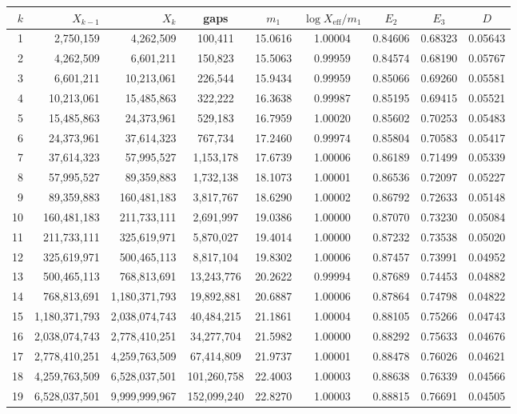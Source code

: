 \begin{tabular}{rrr c c c c c c}
\toprule
$k$ & $X_{k-1}$ & $X_k$ & gaps & $m_1$ & $\log X_{\mathrm{eff}}/m_1$ & $E_2$ & $E_3$ & $D$ \\
\midrule
1 & 2{,}750{,}159 & 4{,}262{,}509 & 100{,}411 & 15.0616 & 1.00004 & 0.84606 & 0.68323 & 0.05643 \\
2 & 4{,}262{,}509 & 6{,}601{,}211 & 150{,}823 & 15.5063 & 0.99959 & 0.84574 & 0.68190 & 0.05767 \\
3 & 6{,}601{,}211 & 10{,}213{,}061 & 226{,}544 & 15.9434 & 0.99959 & 0.85066 & 0.69260 & 0.05581 \\
4 & 10{,}213{,}061 & 15{,}485{,}863 & 322{,}222 & 16.3638 & 0.99987 & 0.85195 & 0.69415 & 0.05521 \\
5 & 15{,}485{,}863 & 24{,}373{,}961 & 529{,}183 & 16.7959 & 1.00020 & 0.85602 & 0.70253 & 0.05483 \\
6 & 24{,}373{,}961 & 37{,}614{,}323 & 767{,}734 & 17.2460 & 0.99974 & 0.85804 & 0.70583 & 0.05417 \\
7 & 37{,}614{,}323 & 57{,}995{,}527 & 1{,}153{,}178 & 17.6739 & 1.00006 & 0.86189 & 0.71499 & 0.05339 \\
8 & 57{,}995{,}527 & 89{,}359{,}883 & 1{,}732{,}138 & 18.1073 & 1.00001 & 0.86536 & 0.72097 & 0.05227 \\
9 & 89{,}359{,}883 & 160{,}481{,}183 & 3{,}817{,}767 & 18.6290 & 1.00002 & 0.86792 & 0.72633 & 0.05148 \\
10 & 160{,}481{,}183 & 211{,}733{,}111 & 2{,}691{,}997 & 19.0386 & 1.00000 & 0.87070 & 0.73230 & 0.05084 \\
11 & 211{,}733{,}111 & 325{,}619{,}971 & 5{,}870{,}027 & 19.4014 & 1.00000 & 0.87232 & 0.73538 & 0.05020 \\
12 & 325{,}619{,}971 & 500{,}465{,}113 & 8{,}817{,}104 & 19.8302 & 1.00006 & 0.87457 & 0.73991 & 0.04952 \\
13 & 500{,}465{,}113 & 768{,}813{,}691 & 13{,}243{,}776 & 20.2622 & 0.99994 & 0.87689 & 0.74453 & 0.04882 \\
14 & 768{,}813{,}691 & 1{,}180{,}371{,}793 & 19{,}892{,}881 & 20.6887 & 1.00006 & 0.87864 & 0.74798 & 0.04822 \\
15 & 1{,}180{,}371{,}793 & 2{,}038{,}074{,}743 & 40{,}484{,}215 & 21.1861 & 1.00004 & 0.88105 & 0.75266 & 0.04743 \\
16 & 2{,}038{,}074{,}743 & 2{,}778{,}410{,}251 & 34{,}277{,}704 & 21.5982 & 1.00000 & 0.88292 & 0.75633 & 0.04676 \\
17 & 2{,}778{,}410{,}251 & 4{,}259{,}763{,}509 & 67{,}414{,}809 & 21.9737 & 1.00001 & 0.88478 & 0.76026 & 0.04621 \\
18 & 4{,}259{,}763{,}509 & 6{,}528{,}037{,}501 & 101{,}260{,}758 & 22.4003 & 1.00003 & 0.88638 & 0.76339 & 0.04566 \\
19 & 6{,}528{,}037{,}501 & 9{,}999{,}999{,}967 & 152{,}099{,}240 & 22.8270 & 1.00003 & 0.88815 & 0.76691 & 0.04505 \\
\bottomrule
\end{tabular}